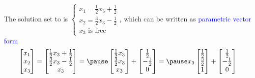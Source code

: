 \documentclass{beamer}
\theoremstyle{definition}
\theoremstyle{remark}
\begin{document}
\begin{frame}[t]
\begin{example}
The solution set to  is $\begin{cases}
x_1=\frac{1}{2}x_3+\frac{1}{2}\\
x_2=\frac{3}{2}x_3-\frac{1}{2}\\
x_3\text{ is free}
\end{cases}$\pause, which can be written as \textcolor{blue}{parametric vector form}
\[
\begin{bmatrix}
x_1\\x_2\\x_3
\end{bmatrix}=\begin{bmatrix}
\frac{1}{2}x_3+\frac{1}{2}\\\frac{3}{2}x_3-\frac{1}{2}\\x_3
\end{bmatrix}=\pause\begin{bmatrix}
\frac{1}{2}x_3\\\frac{3}{2}x_3\\x_3
\end{bmatrix}+\begin{bmatrix}
\frac{1}{2}\\-\frac{1}{2}\\0
\end{bmatrix}=\pause x_3\begin{bmatrix}
\frac{1}{2}\\\frac{3}{2}\\1
\end{bmatrix}+\begin{bmatrix}
\frac{1}{2}\\-\frac{1}{2}\\0
\end{bmatrix}
\]
\end{example}
\end{frame}
\end{document}
